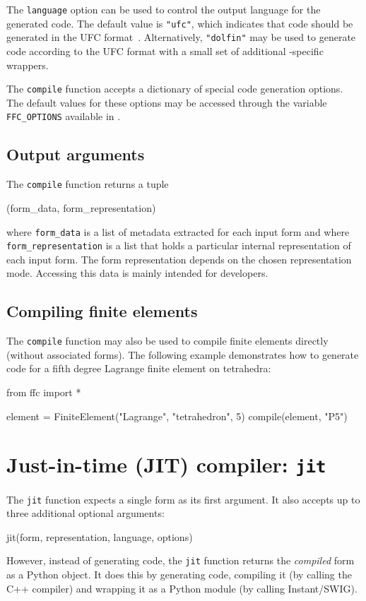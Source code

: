 The \texttt{language} option can be used to control the output
language for the generated code. The default value is \texttt{"ufc"},
which indicates that code should be generated in the UFC
format~\cite{www:ufc,ufcmanual}. Alternatively, \texttt{"dolfin"} may
be used to generate code according to the UFC format with a small set
of additional \dolfin{}-specific wrappers.

The \texttt{compile} function accepts a dictionary of special
code generation options. The default values for these options may be
accessed through the variable \texttt{FFC\_OPTIONS} available in
\ffc{}.

\subsection{Output arguments}

The \texttt{compile} function returns a tuple
\begin{code}
(form_data, form_representation)
\end{code}
where \texttt{form\_data} is a list of metadata
extracted for each input form and where \texttt{form\_representation}
is a list that holds a particular internal representation of each
input form. The form representation depends on the chosen
representation mode. Accessing this data is mainly intended for
developers.

\subsection{Compiling finite elements}

The \texttt{compile} function may also be used to compile finite
elements directly (without associated forms). The following example
demonstrates how to generate code for a fifth degree Lagrange finite
element on tetrahedra:
\begin{code}
from ffc import *

element = FiniteElement("Lagrange", "tetrahedron", 5)
compile(element, "P5")
\end{code}

\section{Just-in-time (JIT) compiler: \texttt{jit}}

The \texttt{jit} function expects a single form
as its first argument. It also accepts up to three additional optional arguments:
\begin{code}
jit(form, representation, language, options)
\end{code}
However, instead of generating code, the \texttt{jit} function returns
the \emph{compiled} form as a Python object. It does this by
generating code, compiling it (by calling the C++ compiler) and
wrapping it as a Python module (by calling Instant/SWIG).

